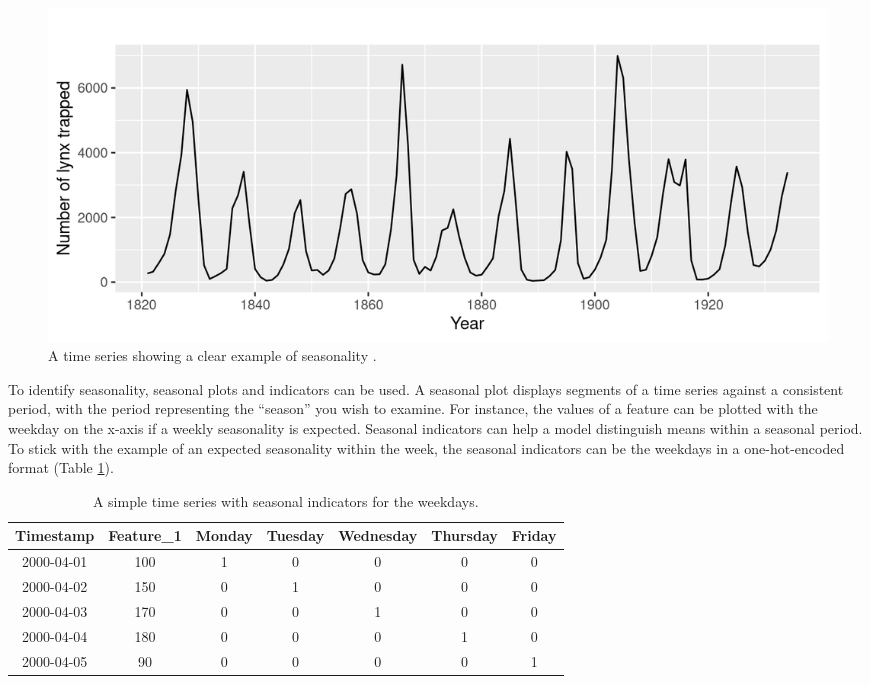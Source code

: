 \begin{figure}[h]
    \centering
    \includegraphics[width=0.75\linewidth]{img/Seasonality Time Series.png}
    \caption{A time series showing a clear example of seasonality \parencite{hyndman2011cyclic}.}
    \label{fig:ts_seasonality}
\end{figure}

To identify seasonality, seasonal plots and indicators can be used. A seasonal plot displays segments of a time series against a consistent period, with the period representing the ``season'' you wish to examine. For instance, the values of a feature can be plotted with the weekday on the x-axis if a weekly seasonality is expected. Seasonal indicators can help a model distinguish means within a seasonal period. To stick with the example of an expected seasonality within the week, the seasonal indicators can be the weekdays in a one-hot-encoded format (Table \ref{tab:time_series_simple}).

\begin{table}[h]
    \centering
    \begin{tabular}{|c|c|c|c|c|c|c|}
        \hline
         \textbf{Timestamp} & \textbf{Feature\_1} & \textbf{Monday} & \textbf{Tuesday} & \textbf{Wednesday} & \textbf{Thursday} & \textbf{Friday} \\
         \hline
         2000-04-01 & 100 & 1 & 0 & 0 & 0 & 0 \\
         \hline
         2000-04-02 & 150 & 0 & 1 & 0 & 0 & 0 \\
         \hline
         2000-04-03 & 170 & 0 & 0 & 1 & 0 & 0 \\
         \hline
         2000-04-04 & 180 & 0 & 0 & 0 & 1 & 0 \\
         \hline
         2000-04-05 & 90 & 0 & 0 & 0 & 0 & 1 \\
         \hline
    \end{tabular}
    \caption{A simple time series with seasonal indicators for the weekdays.}
    \label{tab:time_series_simple}
\end{table}

